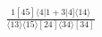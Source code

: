\documentclass[varwidth, border=5pt]{standalone}
\begin{document}
\begin{my}
$\begin{gathered}
\scriptscriptstyle\frac{1[45]⟨4|1+3|4]⟨14⟩}{⟨13⟩⟨15⟩[24]⟨34⟩[34]}
\end{gathered}$
\end{my}
\end{document}
